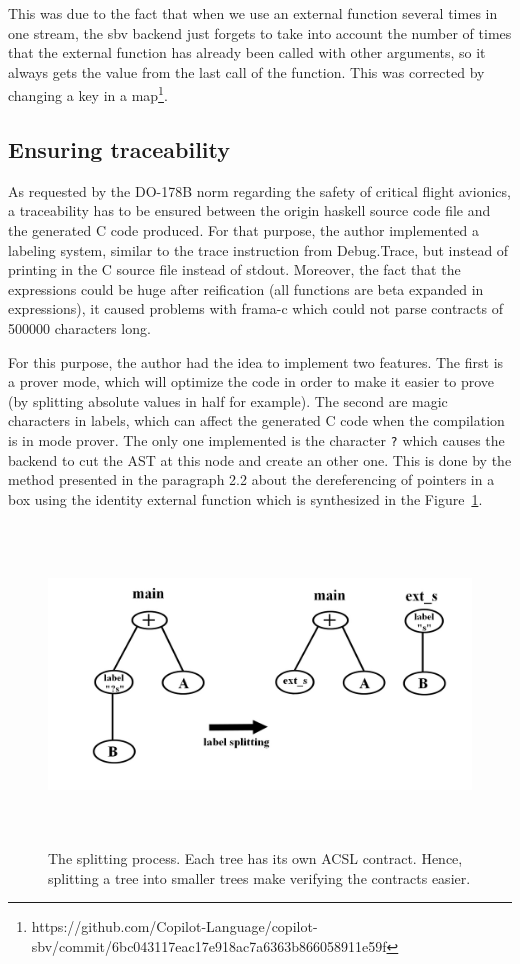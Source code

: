 \documentclass[a4paper,11pt,final]{article}
\begin{document}
  This was due to the fact that when we use an external function several times in one stream, the sbv backend just forgets to take into account the number of times that the external function has already been called with other arguments, so it always gets the value from the last call of the function. This was corrected by changing a key in a map\footnote{https://github.com/Copilot-Language/copilot-sbv/commit/6bc043117eac17e918ac7a6363b866058911e59f}. 
  
  \subsection{Ensuring traceability}
  
  As requested by the DO-178B norm regarding the safety of critical flight avionics, a traceability has to be ensured between the origin haskell source code file and the generated C code produced. For that purpose, the author implemented a labeling system, similar to the trace instruction from Debug.Trace, but instead of printing in the C source file instead of stdout. Moreover, the fact that the expressions could be huge after reification (all functions are beta expanded in expressions), it caused problems with frama-c which could not parse contracts of 500000 characters long. 
  
  For this purpose, the author had the idea to implement two features. The first is a prover mode, which will optimize the code in order to make it easier to prove (by splitting absolute values in half for example). The second are magic characters in labels, which can affect the generated C code when the compilation is in mode prover. The only one implemented is the character \texttt{?} which causes the backend to cut the AST at this node and create an other one. This is done by the method presented in the paragraph 2.2 about the dereferencing of pointers in a box using the identity external function which is synthesized in the Figure~\ref{fig:splitting label}. 
  \begin{figure}
  	\includegraphics[height=85mm]{images/label splitting.jpg}
  	\caption{The splitting process. Each tree has its own ACSL contract. Hence, splitting a tree into smaller trees make verifying the contracts easier.}
  	\label{fig:splitting label}
  \end{figure}
  
\end{document}
